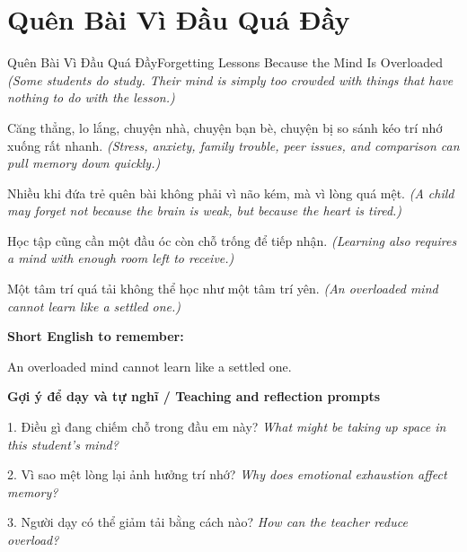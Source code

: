 \section{Quên Bài Vì Đầu Quá Đầy}
\begin{truyen}{Quên Bài Vì Đầu Quá Đầy}{Forgetting Lessons Because the Mind Is Overloaded}
\textit{(Some students do study. Their mind is simply too crowded with things that have nothing to do with the lesson.)}

Căng thẳng, lo lắng, chuyện nhà, chuyện bạn bè, chuyện bị so sánh kéo trí nhớ xuống rất nhanh.
\textit{(Stress, anxiety, family trouble, peer issues, and comparison can pull memory down quickly.)}

Nhiều khi đứa trẻ quên bài không phải vì não kém, mà vì lòng quá mệt.
\textit{(A child may forget not because the brain is weak, but because the heart is tired.)}

Học tập cũng cần một đầu óc còn chỗ trống để tiếp nhận.
\textit{(Learning also requires a mind with enough room left to receive.)}

\end{truyen}

\begin{baihoc}
Một tâm trí quá tải không thể học như một tâm trí yên.
\textit{(An overloaded mind cannot learn like a settled one.)}
\end{baihoc}

\begin{ghinhoanh}
\textbf{Short English to remember:}

An overloaded mind cannot learn like a settled one.

\end{ghinhoanh}

\begin{tuhocnhanh}
\textbf{Gợi ý để dạy và tự nghĩ / Teaching and reflection prompts}

1. Điều gì đang chiếm chỗ trong đầu em này? \textit{What might be taking up space in this student’s mind?}

2. Vì sao mệt lòng lại ảnh hưởng trí nhớ? \textit{Why does emotional exhaustion affect memory?}

3. Người dạy có thể giảm tải bằng cách nào? \textit{How can the teacher reduce overload?}
\end{tuhocnhanh}
\ngancach

